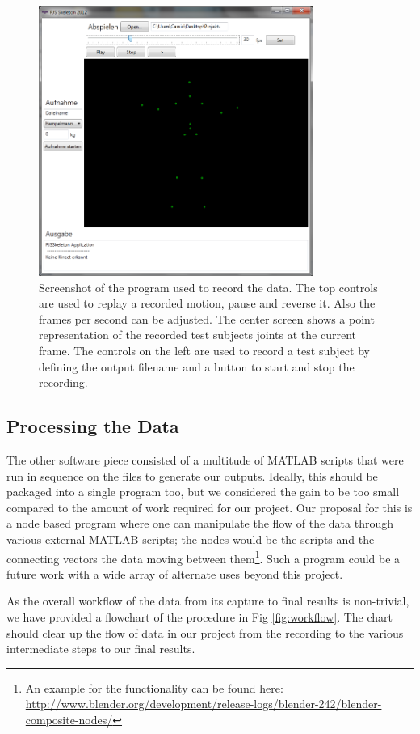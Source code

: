 \documentclass[a4paper]{article}
\begin{document}
\begin{figure}
	\centering
	\includegraphics[width=9cm]{programm.jpg}
	\caption{Screenshot of the program used to record the data. The top controls are used to replay a recorded motion, pause and reverse it. Also the frames per second can be adjusted. The center screen shows a point representation of the recorded test subjects joints at the current frame. The controls on the left are used to record a test subject by defining the output filename and a button to start and stop the recording.}
	\label{fig:programm}
\end{figure}


\subsection{Processing the Data}

The other software piece consisted of a multitude of MATLAB \cite{matlabprograms} scripts that were run in sequence on the files to generate our outputs.
Ideally, this should be packaged into a single program too, but we considered the gain to be too small compared to the amount of work required for our project.
Our proposal for this is a node based program where one can manipulate the flow of the data through various external MATLAB scripts; the nodes would be the scripts and the connecting vectors the data moving between them\footnote{An example for the functionality can be found here: \url{http://www.blender.org/development/release-logs/blender-242/blender-composite-nodes/}}.
Such a program could be a future work with a wide array of alternate uses beyond this project.

As the overall workflow of the data from its capture to final results is non-trivial, we have provided a flowchart of the procedure in Fig \ref{fig:workflow}.
The chart should clear up the flow of data in our project from the recording to the various intermediate steps to our final results.
\end{document}
